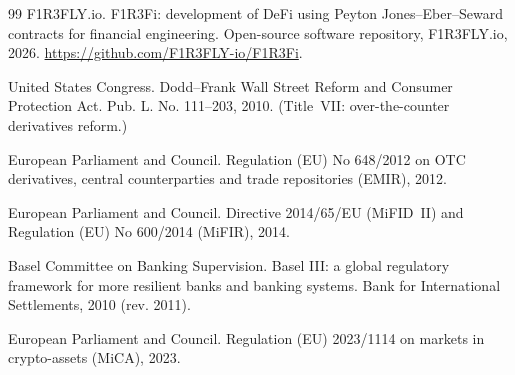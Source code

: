 \documentclass[11pt]{article}
\theoremstyle{definition}
\theoremstyle{plain}
\begin{document}
\begin{thebibliography}{99}
F1R3FLY.io.
\newblock F1R3Fi: development of DeFi using Peyton Jones--Eber--Seward contracts for financial
engineering.
\newblock Open-source software repository, F1R3FLY.io, 2026.
\newblock \url{https://github.com/F1R3FLY-io/F1R3Fi}.

United States Congress.
\newblock Dodd--Frank Wall Street Reform and Consumer Protection Act.
\newblock Pub. L. No. 111--203, 2010. (Title~VII: over-the-counter derivatives reform.)

European Parliament and Council.
\newblock Regulation (EU) No 648/2012 on OTC derivatives, central counterparties and trade
repositories (EMIR), 2012.

European Parliament and Council.
\newblock Directive 2014/65/EU (MiFID~II) and Regulation (EU) No 600/2014 (MiFIR), 2014.

Basel Committee on Banking Supervision.
\newblock Basel III: a global regulatory framework for more resilient banks and banking systems.
\newblock Bank for International Settlements, 2010 (rev. 2011).

European Parliament and Council.
\newblock Regulation (EU) 2023/1114 on markets in crypto-assets (MiCA), 2023.

\end{thebibliography}
\end{document}
